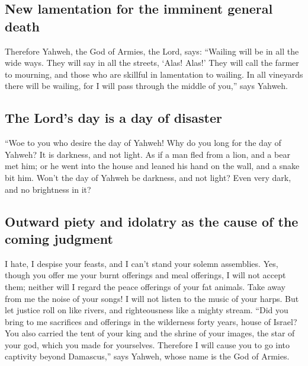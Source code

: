 \hypertarget{new-lamentation-for-the-imminent-general-death}{%
\subsection{New lamentation for the imminent general
death}\label{new-lamentation-for-the-imminent-general-death}}

 Therefore Yahweh, the God of Armies, the Lord, says:
``Wailing will be in all the wide ways. They will say in all the
streets, `Alas! Alas!' They will call the farmer to mourning, and those
who are skillful in lamentation to wailing.  In all
vineyards there will be wailing, for I will pass through the middle of
you,'' says Yahweh.

\hypertarget{the-lords-day-is-a-day-of-disaster}{%
\subsection{The Lord's day is a day of
disaster}\label{the-lords-day-is-a-day-of-disaster}}

 ``Woe to you who desire the day of Yahweh! Why do you
long for the day of Yahweh? It is darkness, and not light.
 As if a man fled from a lion, and a bear met him; or he
went into the house and leaned his hand on the wall, and a snake bit
him.  Won't the day of Yahweh be darkness, and not light?
Even very dark, and no brightness in it?

\hypertarget{outward-piety-and-idolatry-as-the-cause-of-the-coming-judgment}{%
\subsection{Outward piety and idolatry as the cause of the coming
judgment}\label{outward-piety-and-idolatry-as-the-cause-of-the-coming-judgment}}

 I hate, I despise your feasts, and I can't stand your
solemn assemblies.  Yes, though you offer me your burnt
offerings and meal offerings, I will not accept them; neither will I
regard the peace offerings of your fat animals.  Take
away from me the noise of your songs! I will not listen to the music of
your harps.  But let justice roll on like rivers, and
righteousness like a mighty stream.  ``Did you bring to
me sacrifices and offerings in the wilderness forty years, house of
Israel?  You also carried the tent of your king and the
shrine of your images, the star of your god, which you made for
yourselves.  Therefore I will cause you to go into
captivity beyond Damascus,'' says Yahweh, whose name is the God of
Armies.

